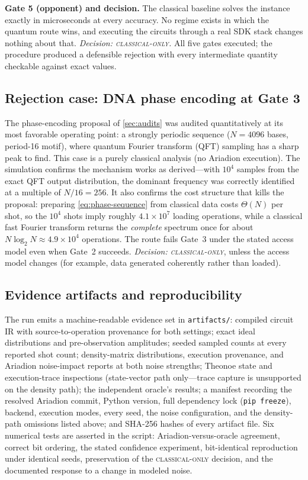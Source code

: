 \textbf{Gate 5 (opponent) and decision.} The classical baseline solves the instance exactly in microseconds at every accuracy. No regime exists in which the quantum route wins, and executing the circuits through a real SDK stack changes nothing about that. \emph{Decision: \textsc{classical-only}.} All five gates executed; the procedure produced a defensible rejection with every intermediate quantity checkable against exact values.

\subsection{Rejection case: DNA phase encoding at Gate 3}

The phase-encoding proposal of \cref{sec:audits} was audited quantitatively at its most favorable operating point: a strongly periodic sequence ($N=4096$ bases, period-16 motif), where quantum Fourier transform (QFT) sampling has a sharp peak to find. This case is a purely classical analysis (no Ariadion execution). The simulation confirms the mechanism works as derived---with $10^4$ samples from the exact QFT output distribution, the dominant frequency was correctly identified at a multiple of $N/16=256$. It also confirms the cost structure that kills the proposal: preparing \cref{eq:phase-sequence} from classical data costs $\Theta(N)$ per shot, so the $10^4$ shots imply roughly $4.1\times10^{7}$ loading operations, while a classical fast Fourier transform returns the \emph{complete} spectrum once for about $N\log_2 N\approx4.9\times10^{4}$ operations. The route fails Gate~3 under the stated access model even when Gate~2 succeeds. \emph{Decision: \textsc{classical-only}}, unless the access model changes (for example, data generated coherently rather than loaded).

\subsection{Evidence artifacts and reproducibility}

The run emits a machine-readable evidence set in \texttt{artifacts/}: compiled circuit IR with source-to-operation provenance for both settings; exact ideal distributions and pre-observation amplitudes; seeded sampled counts at every reported shot count; density-matrix distributions, execution provenance, and Ariadion noise-impact reports at both noise strengths; Theonoe state and execution-trace inspections (state-vector path only---trace capture is unsupported on the density path); the independent oracle's results; a manifest recording the resolved Ariadion commit, Python version, full dependency lock (\texttt{pip freeze}), backend, execution modes, every seed, the noise configuration, and the density-path omissions listed above; and SHA-256 hashes of every artifact file. Six numerical tests are asserted in the script: Ariadion-versus-oracle agreement, correct bit ordering, the stated confidence experiment, bit-identical reproduction under identical seeds, preservation of the \textsc{classical-only} decision, and the documented response to a change in modeled noise.

